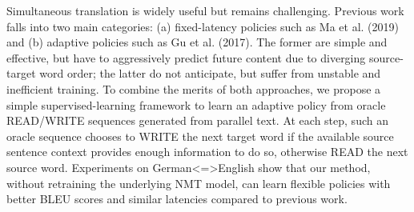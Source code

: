 Simultaneous translation is widely useful but remains challenging.  Previous work falls into two main categories: (a) fixed-latency policies such as Ma et al. (2019) and (b) adaptive policies such as Gu et al. (2017).  The former are simple and effective, but have to aggressively predict future content due to diverging source-target word order; the latter do not anticipate, but suffer from unstable and inefficient training.  To combine the merits of both approaches, we propose a simple supervised-learning framework to learn an adaptive policy from oracle READ/WRITE sequences generated from parallel text.  At each step, such an oracle sequence chooses to WRITE the next target word if the available source sentence context provides enough information to do so, otherwise READ the next source word.  Experiments on German<=>English show that our method, without retraining the underlying NMT model, can learn flexible policies with better BLEU scores and similar latencies compared to previous work.